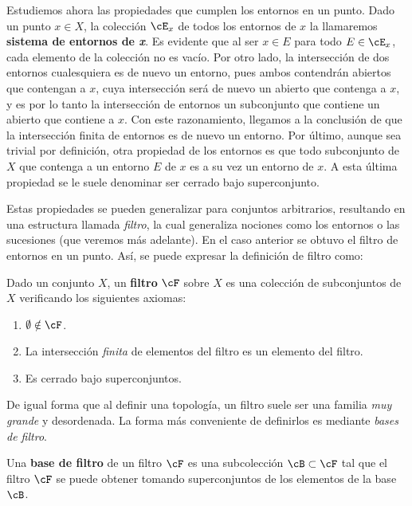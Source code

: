 \begin{amp}
    \bigskip

    Estudiemos ahora las propiedades que cumplen los entornos en un punto. Dado un punto $x\in X$, la colección $\cE_x$ de todos los entornos de $x$ la llamaremos {\bf sistema de entornos de \textit{x}}. Es evidente que al ser $x\in E$ para todo $E\in\cE_x$, cada elemento de la colección no es vacío. Por otro lado, la intersección de dos entornos cualesquiera es de nuevo un entorno, pues ambos contendrán abiertos que contengan a $x$, cuya intersección será de nuevo un abierto que contenga a $x$, y es por lo tanto la intersección de entornos un subconjunto que contiene un abierto que contiene a $x$. Con este razonamiento, llegamos a la conclusión de que la intersección finita de entornos es de nuevo un entorno. Por último, aunque sea trivial por definición, otra propiedad de los entornos es que todo subconjunto de $X$ que contenga a un entorno $E$ de $x$ es a su vez un entorno de $x$. A esta última propiedad se le suele denominar ser cerrado bajo superconjunto.

    Estas propiedades se pueden generalizar para conjuntos arbitrarios, resultando en una estructura llamada \textit{filtro}, la cual generaliza nociones como los entornos o las sucesiones (que veremos más adelante). En el caso anterior se obtuvo el filtro de entornos en un punto. Así, se puede expresar la definición de filtro como:

    \begin{deff}
        Dado un conjunto $X$, un {\bf filtro} $\cF$ sobre $X$ es una colección de subconjuntos de $X$ verificando los siguientes axiomas:
        \begin{enumerate}[leftmargin=15pt,itemsep=0pt, topsep=5pt]
            \item $\emptyset \notin \cF$.
            \item La intersección {\it finita} de elementos del filtro es un elemento del filtro.
            \item Es cerrado bajo superconjuntos.
    \end{enumerate}
    \end{deff}

    De igual forma que al definir una topología, un filtro suele ser una familia \textit{muy grande} y desordenada. La forma más conveniente de definirlos es mediante {\it bases de filtro}. 

    \begin{deff}
        Una {\bf base de filtro } de un filtro $\cF$ es una subcolección $\cB\subset \cF$ tal que el filtro $\cF$ se puede obtener tomando superconjuntos de los elementos de la base $\cB$.
    \end{deff}


\end{amp}
